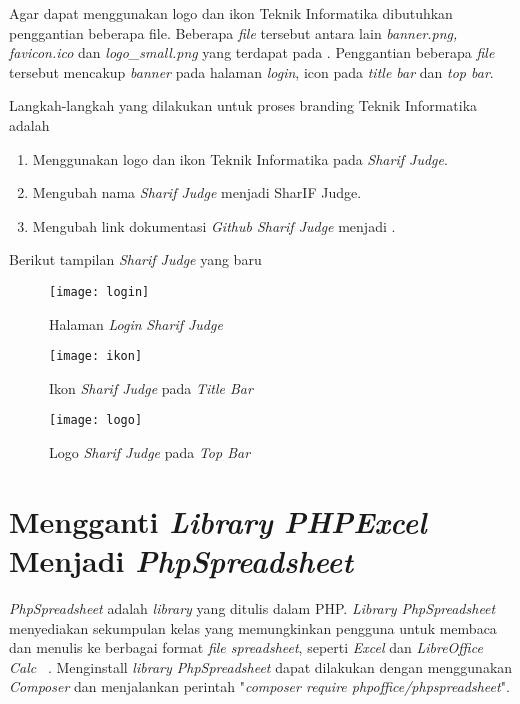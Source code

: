 Agar dapat menggunakan logo dan ikon Teknik Informatika dibutuhkan penggantian beberapa file. Beberapa \textit{file} tersebut antara lain \textit{banner.png, favicon.ico} dan \textit{logo\_small.png} yang terdapat pada . Penggantian beberapa \textit{file} tersebut mencakup \textit{banner} pada halaman \textit{login}, icon pada \textit{title bar} dan \textit{top bar}.

Langkah-langkah yang dilakukan untuk proses branding Teknik Informatika adalah
\begin{enumerate}
	\item Menggunakan logo dan ikon Teknik Informatika pada \textit{Sharif Judge}.
	\item Mengubah nama \textit{Sharif Judge} menjadi SharIF Judge.
	\item Mengubah link dokumentasi \textit{Github Sharif Judge} menjadi .
\end{enumerate}

Berikut tampilan \textit{Sharif Judge} yang baru
\begin{figure}[H]
	\centering  
	\texttt{[image: login]}  
	\caption[Halaman \textit{Login} \textit{Sharif Judge}]{Halaman \textit{Login} \textit{Sharif Judge}} 
	\label{fig:login} 
\end{figure}

\begin{figure}[H]
	\centering  
	\texttt{[image: ikon]}  
	\caption[Ikon \textit{Sharif Judge} pada \textit{Title Bar}]{Ikon \textit{Sharif Judge} pada \textit{Title Bar}} 
	\label{fig:ikon} 
\end{figure} 

\begin{figure}[H]
	\centering  
	\texttt{[image: logo]}  
	\caption[Logo \textit{Sharif Judge} pada \textit{Top Bar}]{Logo \textit{Sharif Judge} pada \textit{Top Bar}} 
	\label{fig:logo} 
\end{figure} 

\section{Mengganti \textit{Library PHPExcel} Menjadi \textit{PhpSpreadsheet}}
\textit{PhpSpreadsheet} adalah \textit{library} yang ditulis dalam PHP. \textit{Library PhpSpreadsheet} menyediakan sekumpulan kelas yang memungkinkan pengguna untuk membaca dan menulis ke berbagai format \textit{file spreadsheet}, seperti \textit{Excel} dan \textit{LibreOffice Calc} ~\cite{phpoffice:10:phpspreadsheet}. Menginstall \textit{library PhpSpreadsheet} dapat dilakukan dengan menggunakan \textit{Composer} dan menjalankan perintah "\textit{composer require phpoffice/phpspreadsheet}".

